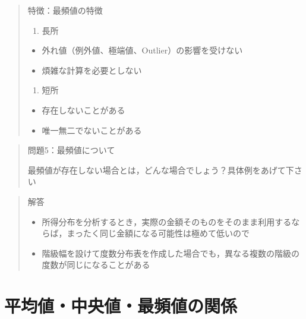 \documentclass[
]{book}
\providecommand{\tightlist}{%
  \setlength{\itemsep}{0pt}\setlength{\parskip}{0pt}}
\theoremstyle{definition}
\theoremstyle{definition}
\theoremstyle{definition}
\theoremstyle{definition}
\theoremstyle{remark}
\begin{document}
\begin{quote}
特徴：最頻値の特徴

\begin{enumerate}
\def\labelenumi{\arabic{enumi}.}
\tightlist
\item
  長所
\end{enumerate}

\begin{itemize}
\tightlist
\item
  外れ値（例外値、極端値、Outlier）の影響を受けない
\item
  煩雑な計算を必要としない
\end{itemize}

\begin{enumerate}
\def\labelenumi{\arabic{enumi}.}
\setcounter{enumi}{1}
\tightlist
\item
  短所
\end{enumerate}

\begin{itemize}
\tightlist
\item
  存在しないことがある
\item
  唯一無二でないことがある
\end{itemize}
\end{quote}

\begin{quote}
問題5：最頻値について

最頻値が存在しない場合とは，どんな場合でしょう？具体例をあげて下さい
\end{quote}

\begin{quote}
解答

\begin{itemize}
\tightlist
\item
  所得分布を分析するとき，実際の金額そのものをそのまま利用するならば，まったく同じ金額になる可能性は極めて低いので
\item
  階級幅を設けて度数分布表を作成した場合でも，異なる複数の階級の度数が同じになることがある
\end{itemize}
\end{quote}

\hypertarget{ux5e73ux5747ux5024ux4e2dux592eux5024ux6700ux983bux5024ux306eux95a2ux4fc2}{%
\section{平均値・中央値・最頻値の関係}\label{ux5e73ux5747ux5024ux4e2dux592eux5024ux6700ux983bux5024ux306eux95a2ux4fc2}}
\end{document}
